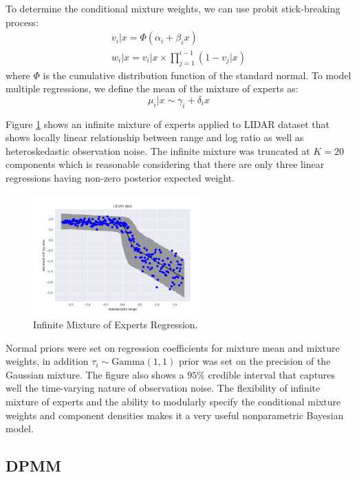 To determine the conditional mixture weights, we can use probit stick-breaking process:
\begin{eqnarray}
    v_i | x = \Phi(\alpha_i + \beta_i x) \\
    w_i | x = v_i | x \times \prod_{j=1}^{i-1}(1-v_j|x)
\end{eqnarray}
where $\Phi$ is the cumulative distribution function of the standard normal. To model multiple regressions, we define the mean of the mixture of experts as:
\begin{equation}
    \mu_i | x \sim \gamma_i + \delta_i x
\end{equation}

Figure \ref{fig:moe_reg} shows an infinite mixture of experts applied to LIDAR dataset that shows locally linear relationship between range and log ratio as well as heteroskedastic observation noise. The infinite mixture was truncated at $K=20$ components which is reasonable considering that there are only three linear regressions having non-zero posterior expected weight.

\begin{figure}[thpb]
    \centering
    \includegraphics[width=0.6\textwidth, trim={10 10 10 10}]{figures/mixture_of_experts.png}
    \caption{Infinite Mixture of Experts Regression.}
    \label{fig:moe_reg}
\end{figure}

Normal priors were set on regression coefficients for mixture mean and mixture weights, in addition $\tau_i \sim \mathrm{Gamma}(1,1)$ prior was set on the precision of the Gaussian mixture. The figure also shows a $95\%$ credible interval that captures well the time-varying nature of observation noise. The flexibility of infinite mixture of experts and the ability to modularly specify the conditional mixture weights and component densities makes it a very useful nonparametric Bayesian model. 

\subsection{DPMM}

